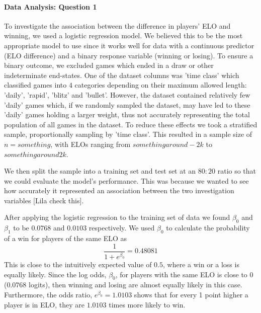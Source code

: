 \documentclass[10pt,a4paper,twocolumn]{article}
\begin{document}
\paragraph{Data Analysis: Question 1}
To investigate the association between the difference in players' ELO and winning, we used a logistic regression model. We believed this to be the most appropriate model to use since it works well for data with a continuous predictor (ELO difference) and a binary response variable (winning or losing). To ensure a binary outcome, we excluded games which ended in a draw or other indeterminate end-states.
One of the dataset columns was 'time class' which classified games into $4$ categories depending on their maximum allowed length: 'daily', 'rapid', 'blitz' and 'bullet'. However, the dataset contained relatively few 'daily' games which, if we randomly sampled the dataset, may have led to these 'daily' games holding a larger weight, thus not accurately representing the total population of all games in the dataset.
To reduce these effects we took a stratified sample, proportionally sampling by 'time class'. This resulted in a sample size of $n={something}$, with ELOs ranging from ${something around -2k}$ to ${something around 2k}$. \newline

We then split the sample into a training set and test set at an $80:20$ ratio so that we could evaluate the model's performance. This was because we wanted to see how accurately it represented an association between the two investigation variables [Lila check this].

After applying the logistic regression to the training set of data we found $\beta_{0}$ and $\beta_{1}$ to be $0.0768$ and $0.0103$ respectively. We used $\beta_{0}$ to calculate the probability of a win for players of the same ELO as 
$$\displaystyle\frac{1}{1+e^{\beta_{0}}} = 0.48081$$
This is close to the intuitively expected value of $0.5$, where a win or a loss is equally likely. Since the log odds, $\beta_{0}$, for players with the same ELO is close to $0$ ($0.0768$ logits), then winning and losing are almost equally likely in this case. Furthermore, the odds ratio, $e^{\beta_{0}} = 1.0103$ shows that for every 1 point higher a player is in ELO, they are $1.0103$ times more likely to win. \newline
\end{document}
